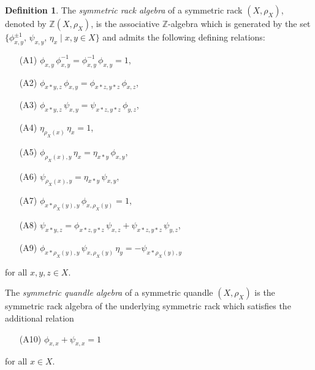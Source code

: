 \documentclass[11pt,reqno]{amsart}
\theoremstyle{definition}
\newtheorem{definition}[theorem]{Definition}
\numberwithin{equation}{subsection}
\begin{document}
\begin{definition}
		The \textit{symmetric rack algebra} of a symmetric rack $(X, \rho_X)$, denoted by $\mathbb{Z}(X,\rho_X)$, is the associative $\mathbb{Z}$-algebra which is generated by the set $\{\phi_{x,y}^{\pm 1}, \, \psi_{x,y}, \,\eta_x \mid x,y \in X \}$ and admits the following defining relations: 
		\begin{enumerate}\label{axiom}
			\item[(A1)] $\phi_{x,y} \, \phi_{x,y}^{-1}=\phi_{x,y}^{-1} \,\phi_{x,y}=1$,
			\item[(A2)] $\phi_{x \ast y,z} \,\phi_{x,y}=\phi_{x \ast z, y \ast z} \,\phi_{x,z}$,
			\item[(A3)] $\phi_{x \ast y,z} \,\psi_{x,y}=\psi_{x \ast z, y \ast z} \,\phi_{y,z}$,
			\item[(A4)] $\eta_{\rho_X(x)} \,\eta_x=1$,
			\item[(A5)] $\phi_{\rho_X(x),y} \,\eta_x= \eta_{x\ast y} \, \phi_{x,y}$,
			\item[(A6)] $\psi_{\rho_X(x),y}= \eta_{x \ast y} \, \psi_{x,y}$,
			\item[(A7)] $\phi_{x \ast \rho_X(y),y} \,\phi_{x, \rho_X(y)}=1$,
			\item[(A8)] $\psi_{x \ast y,z}=\phi_{x \ast z, y \ast z} \,\psi_{x,z}+\psi_{x \ast z, y \ast z}\, \psi_{y,z}$,
			\item[(A9)] $\phi_{x \ast \rho_X(y),y} \,\psi_{x, \rho_X(y)} \,\eta_y =- \psi_{x \ast \rho_X(y), y}$
		\end{enumerate}
	for all $x,y,z \in X.$
\par
The \textit{symmetric quandle algebra} of a symmetric quandle $(X, \rho_X)$ is the symmetric rack algebra of the underlying symmetric rack which satisfies the additional relation
		\begin{enumerate}\label{Qaxiom}
			\item [(A10)] $\phi_{x,x}+\psi_{x,x}=1$
		\end{enumerate}
	for all $x \in X.$
\end{definition}
\end{document}
